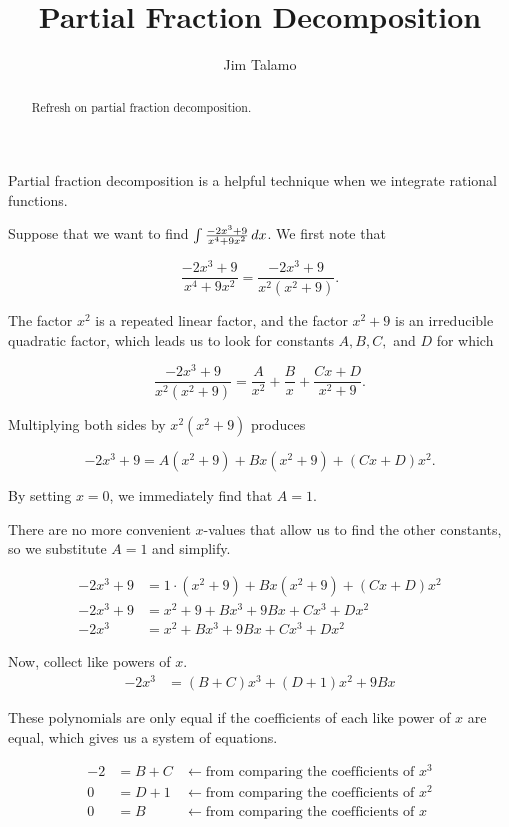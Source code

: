 \documentclass{ximera}
\title[Refresh:]{Partial Fraction Decomposition}
\author{Jim Talamo}
\begin{document}
\begin{abstract}
 Refresh on partial fraction decomposition.
\end{abstract}
\maketitle


\begin{exercise}
Partial fraction decomposition is a helpful technique when we integrate rational functions. 

\begin{example}
Suppose that we want to find $\int \frac{-2x^3+9}{x^4+9x^2} \mathop{}\!d x$.  We first note that 

\[
\frac{-2x^3+9}{x^4+9x^2} = \frac{-2x^3+9}{x^2(x^2+9)}.
\] 

The factor $x^2$ is a repeated linear factor, and the factor $x^2+9$ is an irreducible quadratic factor, which leads us to look for constants $A, B, C,$ and $D$ for which 

\[
\frac{-2x^3+9}{x^2(x^2+9)} = \frac{A}{x^2}+\frac{B}{x}+\frac{Cx+D}{x^2+9}.
\]

Multiplying both sides by $x^2(x^2+9)$ produces

\[
-2x^3+9 = A(x^2+9)+Bx(x^2+9)+(Cx+D)x^2.
\]

By setting $x=0$, we immediately find that $A=1$.

There are no more convenient $x$-values that allow us to find the other constants, so we substitute $A=1$ and simplify.

\begin{align*}
-2x^3+9 &= 1\cdot(x^2+9)+Bx(x^2+9)+(Cx+D)x^2 \\
-2x^3+9 &= x^2+9+Bx^3+9Bx+Cx^3+Dx^2 \\
-2x^3 &= x^2+Bx^3+9Bx+Cx^3+Dx^2
\end{align*}

Now, collect like powers of $x$.
\begin{align*}
-2x^3 &= (B+C)x^3 +(D+1)x^2 +9Bx
\end{align*}

These polynomials are only equal if the coefficients of each like power of $x$ are equal, which gives us a system of equations.

\begin{align*}
-2 & = B+C & \longleftarrow \textrm{from comparing the coefficients of } x^3 \\
0 & = D+1 & \longleftarrow  \textrm{from comparing the coefficients of } x^2 \\
0 & = B & \longleftarrow  \textrm{from comparing the coefficients of } x 
\end{align*}


\end{example}
\end{exercise}
\end{document}

